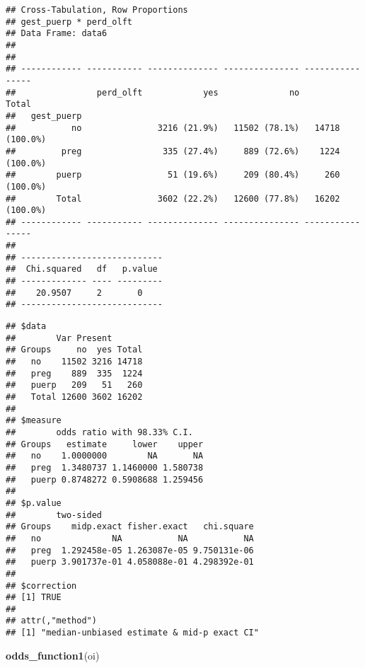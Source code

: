 \documentclass[
]{article}
\newenvironment{Shaded}{\begin{snugshade}}{\end{snugshade}}
\newcommand{\KeywordTok}[1]{\textcolor[rgb]{0.13,0.29,0.53}{\textbf{#1}}}
\newcommand{\NormalTok}[1]{#1}
\newcommand{\OperatorTok}[1]{\textcolor[rgb]{0.81,0.36,0.00}{\textbf{#1}}}
\newcommand{\StringTok}[1]{\textcolor[rgb]{0.31,0.60,0.02}{#1}}
\begin{document}
\begin{verbatim}
## Cross-Tabulation, Row Proportions  
## gest_puerp * perd_olft  
## Data Frame: data6  
## 
## 
## ------------ ----------- -------------- --------------- ----------------
##                perd_olft            yes              no            Total
##   gest_puerp                                                            
##           no               3216 (21.9%)   11502 (78.1%)   14718 (100.0%)
##         preg                335 (27.4%)     889 (72.6%)    1224 (100.0%)
##        puerp                 51 (19.6%)     209 (80.4%)     260 (100.0%)
##        Total               3602 (22.2%)   12600 (77.8%)   16202 (100.0%)
## ------------ ----------- -------------- --------------- ----------------
## 
## ----------------------------
##  Chi.squared   df   p.value 
## ------------- ---- ---------
##    20.9507     2       0    
## ----------------------------
\end{verbatim}

\begin{Shaded}
\end{Shaded}

\begin{verbatim}
## $data
##        Var Present
## Groups     no  yes Total
##   no    11502 3216 14718
##   preg    889  335  1224
##   puerp   209   51   260
##   Total 12600 3602 16202
## 
## $measure
##        odds ratio with 98.33% C.I.
## Groups   estimate     lower    upper
##   no    1.0000000        NA       NA
##   preg  1.3480737 1.1460000 1.580738
##   puerp 0.8748272 0.5908688 1.259456
## 
## $p.value
##        two-sided
## Groups    midp.exact fisher.exact   chi.square
##   no              NA           NA           NA
##   preg  1.292458e-05 1.263087e-05 9.750131e-06
##   puerp 3.901737e-01 4.058088e-01 4.298392e-01
## 
## $correction
## [1] TRUE
## 
## attr(,"method")
## [1] "median-unbiased estimate & mid-p exact CI"
\end{verbatim}

\begin{Shaded}
\begin{Highlighting}[]
\KeywordTok{odds_function1}\NormalTok{(oi)}
\end{Highlighting}
\end{Shaded}
\end{document}
